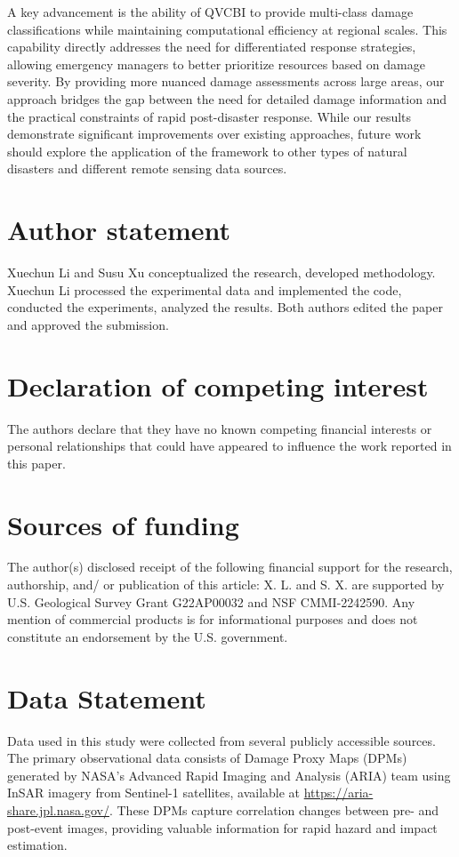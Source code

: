 \documentclass[review]{elsarticle}
\begin{document}
A key advancement is the ability of QVCBI to provide multi-class damage classifications while maintaining computational efficiency at regional scales. This capability directly addresses the need for differentiated response strategies, allowing emergency managers to better prioritize resources based on damage severity. By providing more nuanced damage assessments across large areas, our approach bridges the gap between the need for detailed damage information and the practical constraints of rapid post-disaster response. While our results demonstrate significant improvements over existing approaches, future work should explore the application of the framework to other types of natural disasters and different remote sensing data sources. 

\section*{Author statement}
Xuechun Li and Susu Xu conceptualized the research, developed methodology. Xuechun Li processed the experimental data and implemented the code, conducted the experiments, analyzed the results. Both authors edited the paper and approved the submission.


\section*{Declaration of competing interest}
The authors declare that they have no known competing financial interests or personal relationships that could have appeared to influence the work reported in this paper.

\section*{Sources of funding}
The author(s) disclosed receipt of the following financial support for the research, authorship, and/ or publication of this article: X. L. and S. X. are supported by U.S. Geological Survey Grant G22AP00032 and NSF CMMI-2242590. 
Any mention of commercial products is for informational purposes and does not constitute an endorsement by the U.S. government.


\section*{Data Statement}
Data used in this study were collected from several publicly accessible sources. The primary observational data consists of Damage Proxy Maps (DPMs) generated by NASA's Advanced Rapid Imaging and Analysis (ARIA) team using InSAR imagery from Sentinel-1 satellites, available at \url{https://aria-share.jpl.nasa.gov/}. These DPMs capture correlation changes between pre- and post-event images, providing valuable information for rapid hazard and impact estimation.
\end{document}
